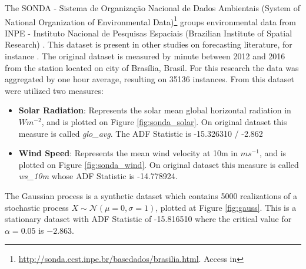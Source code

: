 The SONDA - Sistema de Organização Nacional de Dados Ambientais (System of National Organization of Environmental Data)\footnote{\url{http://sonda.ccst.inpe.br/basedados/brasilia.html}. Access in } groups environmental data from INPE - Instituto Nacional de Pesquisas Espaciais (Brazilian Institute of Spatial Research) . This dataset is present in other studies on forecasting literature, for instance \cite{Martins2012}. The original dataset is measured by minute between 2012 and 2016 from the station located on city of Brasília, Brasil. For this research the data was aggregated by one hour average, resulting on 35136 instances. From this dataset were utilized two measures:
\begin{itemize}
\item \textbf{Solar Radiation}: Represents the solar mean global horizontal radiation in  $Wm^{-2}$, and is plotted on Figure \ref{fig:sonda_solar}. On original dataset this measure is called \textit{glo\_avg}. The ADF Statistic is -15.326310 / -2.862
\item \textbf{Wind Speed}: Represents the mean wind velocity at 10m in $ms^{-1}$, and is plotted on Figure \ref{fig:sonda_wind}. On original dataset this measure is called \textit{ws\_10m} whose ADF Statistic is -14.778924.
\end{itemize}

The Gaussian process is a synthetic dataset which contains 5000 realizations of a stochastic process $X \sim  \mathcal{N}(\mu = 0, \sigma = 1)$, plotted at Figure \ref{fig:gauss}. This is a stationary dataset with ADF Statistic of -15.816510 where the critical value for $\alpha = 0.05$ is $-2.863$.

